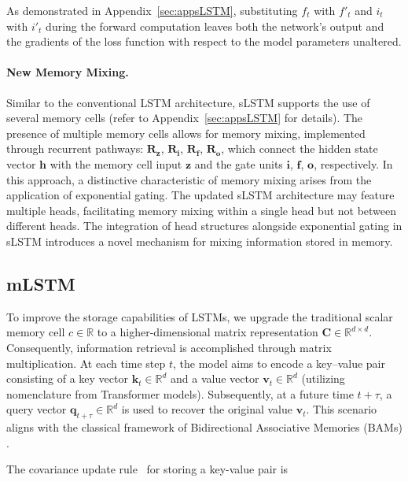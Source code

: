 As demonstrated in Appendix~\ref{sec:appsLSTM}, substituting $f_t$ with $f'_t$ and $i_t$ with $i'_t$ during the forward computation leaves both the network’s output and the gradients of the loss function with respect to the model parameters unaltered.

\paragraph{New Memory Mixing.} Similar to the conventional LSTM architecture, sLSTM supports the use of several memory cells (refer to Appendix~\ref{sec:appsLSTM} for details). The presence of multiple memory cells allows for memory mixing, implemented through recurrent pathways: $\mathbf{R}_{\mathbf{z}}$, $\mathbf{R}_{\mathbf{i}}$, $\mathbf{R}_{\mathbf{f}}$, $\mathbf{R}_{\mathbf{o}}$, which connect the hidden state vector $\mathbf{h}$ with the memory cell input $\mathbf{z}$ and the gate units $\mathbf{i}$, $\mathbf{f}$, $\mathbf{o}$, respectively. In this approach, a distinctive characteristic of memory mixing arises from the application of exponential gating. The updated sLSTM architecture may feature multiple heads, facilitating memory mixing within a single head but not between different heads. The integration of head structures alongside exponential gating in sLSTM introduces a novel mechanism for mixing information stored in memory.

\subsection{mLSTM}
\label{sec:mLSTM}

To improve the storage capabilities of LSTMs, we upgrade the traditional scalar memory cell $c \in \mathbb{R}$ to a higher-dimensional matrix representation $\mathbf{C} \in \mathbb{R}^{d \times d}$. Consequently, information retrieval is accomplished through matrix multiplication. At each time step $t$, the model aims to encode a key–value pair consisting of a key vector $\mathbf{k}_t \in \mathbb{R}^d$ and a value vector $\mathbf{v}_t \in \mathbb{R}^d$ (utilizing nomenclature from Transformer models). Subsequently, at a future time $t + \tau$, a query vector $\mathbf{q}_{t+\tau} \in \mathbb{R}^d$ is used to recover the original value $\mathbf{v}_t$. This scenario aligns with the classical framework of Bidirectional Associative Memories (BAMs) \citep{Kohonen:72,Anderson:72,Nakano:72,Anderson:77}.

The covariance update rule~\citep{Sejnowski:77,Dayan:91} for storing a key-value pair is

